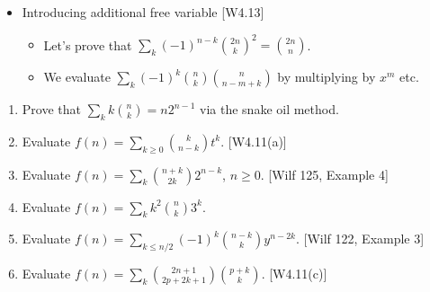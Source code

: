 \documentclass[10pt, a4paper]{article}
\newcommand*\ruleline[1]{\par\noindent\raisebox{.8ex}{\makebox[\linewidth]{\hrulefill\hspace{1ex}\raisebox{-.8ex}{#1}\hspace{1ex}\hrulefill}}}
\def\ans#1{\big[\hskip 2mm {#1}\hskip 2mm\big]}
\begin{document}
\begin{itemize}
\item 
Introducing additional free variable [W4.13]
\begin{itemize}
    \item Let's prove that $\sum_k (-1)^{n-k}{2n\choose k}^2={2n\choose n}$.
    \item We evaluate $\sum_k (-1)^k{n\choose k}{n\choose n-m+k}$ by multiplying by $x^m$ etc. %
\end{itemize}

\end{itemize}

\ruleline{Exercises}
\begin{enumerate}
    \item Prove that $\sum_k k{n\choose k} = n2^{n-1}$ via the snake oil method.
            \ans{$L(x) = P(x) = {x\over (1-2x)^2}$}
    \item Evaluate $\displaystyle f(n)=\sum_{k\ge 0} {k\choose n-k}t^k$. [W4.11(a)] \\[2mm]
            \ans{$F(x)=1/(1-tx+x^2)$}
    \item Evaluate $\displaystyle f(n)=\sum_k {n+k\choose 2k}2^{n-k}$, $n\ge 0$. [Wilf 125, Example 4] \\[2mm]
            \ans{$F(x)={1-2x\over (1-x)(1-4x)}={2\over 3(1-4x)}+{1\over 3(1-x)}$; $f(n)=(2^{2n+1}+1)/3$}
    \item Evaluate $\displaystyle f(n)=\sum_k k^2{n\choose k}3^k$. \\[2mm]
            \ans{$F(x)={3x(1+2x)\over (1-4x)^3}={3/8\over 1-4x}-{3/2\over (1-4x)^2}+{9/8\over (1-4x)^3}$; $f(n)=3\cdot 4^{n-2}\cdot n(1+3n)$}
    \item Evaluate $\displaystyle f(n)=\sum_{k\le n/2} (-1)^k{n-k\choose k}y^{n-2k}$. [Wilf 122, Example 3]\\[2mm]
            \ans{$F(x)=1/(1-xy+x^2)$}
    \item Evaluate $\displaystyle f(n)=\sum_{k} {2n+1\choose 2p+2k+1}{p+k\choose k}$. [W4.11(c)]\\[2mm]
            \ans{replace $2n+1$ by $m$ and solve for $f(m)={m-p-1\choose p}2^{m-2p-1}$;  $f(2n+1)={2n-p\choose p}4^{n-p}$;\\[2mm]
                    $\displaystyle F(x) = {x\over (1-x)^2}\sum_{k\ge 0} {p+k\choose p} \left({x\over 1-x}\right)^{2(p+k)}
                    ={x^{p+1}\over 2^p}\cdot {(2x)^p\over (1-2x)^{p+1}}$}
\end{enumerate}



\newpage
\end{document}

